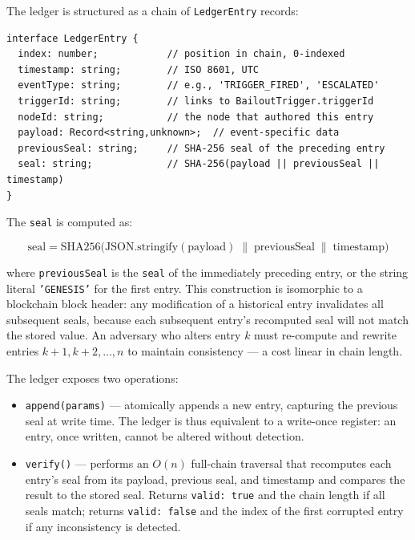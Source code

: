The ledger is structured as a chain of \texttt{LedgerEntry} records:

\begin{verbatim}
interface LedgerEntry {
  index: number;            // position in chain, 0-indexed
  timestamp: string;        // ISO 8601, UTC
  eventType: string;        // e.g., 'TRIGGER_FIRED', 'ESCALATED'
  triggerId: string;        // links to BailoutTrigger.triggerId
  nodeId: string;           // the node that authored this entry
  payload: Record<string,unknown>;  // event-specific data
  previousSeal: string;     // SHA-256 seal of the preceding entry
  seal: string;             // SHA-256(payload || previousSeal || timestamp)
}
\end{verbatim}

The \texttt{seal} is computed as:

\begin{equation}
\label{eq:ledger-seal}
\text{seal} = \text{SHA256}\bigl(
  \text{JSON.stringify}(\text{payload}) \;\|\; \text{previousSeal} \;\|\; \text{timestamp}
\bigr)
\end{equation}

where \texttt{previousSeal} is the \texttt{seal} of the immediately preceding
entry, or the string literal \texttt{'GENESIS'} for the first entry.  This
construction is isomorphic to a blockchain block header: any modification of a
historical entry invalidates all subsequent seals, because each subsequent
entry's recomputed seal will not match the stored value.  An adversary who
alters entry $k$ must re-compute and rewrite entries $k+1, k+2, \ldots, n$
to maintain consistency --- a cost linear in chain length.

The ledger exposes two operations:

\begin{itemize}
  \item \texttt{append(params)} --- atomically appends a new entry, capturing
        the previous seal at write time.  The ledger is thus equivalent to a
        write-once register: an entry, once written, cannot be altered without
        detection.
  \item \texttt{verify()} --- performs an $O(n)$ full-chain traversal that
        recomputes each entry's seal from its payload, previous seal, and
        timestamp and compares the result to the stored seal.  Returns
        \texttt{valid: true} and the chain length if all seals match; returns
        \texttt{valid: false} and the index of the first corrupted entry if any
        inconsistency is detected.
\end{itemize}

